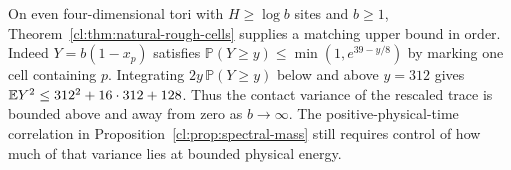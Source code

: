 On even four-dimensional tori with \(H\ge\log b\) sites and \(b\ge1\),
Theorem~\ref{cl:thm:natural-rough-cells} supplies a matching upper
bound in order. Indeed \(Y=b(1-x_p)\) satisfies
\(\mathbb P(Y\ge y)\le\min(1,e^{39-y/8})\) by marking one cell
containing \(p\). Integrating \(2y\,\mathbb P(Y\ge y)\) below and above
\(y=312\) gives \(\mathbb{E} Y^2\le 312^2+16\cdot312+128\).
Thus the contact variance of the rescaled trace is bounded above and
away from zero as \(b\to\infty\). The positive-physical-time correlation
in Proposition~\ref{cl:prop:spectral-mass} still requires control of
how much of that variance lies at bounded physical energy.
